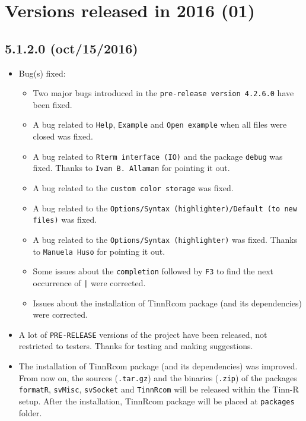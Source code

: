 
\hypertarget{2016}{}
\section{Versions released in 2016 (01)}

\subsection*{5.1.2.0 (oct/15/2016)}
\begin{itemize}
  \item Bug(s) fixed:
    \begin{itemize}
      \item Two major bugs introduced in the \texttt{pre-release version 4.2.6.0} have been fixed.
      \item A bug related to \texttt{Help}, \texttt{Example} and \texttt{Open example}
        when all files were closed was fixed.
      \item A bug related to \texttt{Rterm interface (IO)} and the package \texttt{debug} was fixed.
        Thanks to \texttt{Ivan B. Allaman} for pointing it out.
      \item A bug related to the \texttt{custom color storage} was fixed.
      \item A bug related to the \texttt{Options/Syntax (highlighter)/Default (to new files)} was fixed.
      \item A bug related to the \texttt{Options/Syntax (highlighter)} was fixed.
        Thanks to \texttt{Manuela Huso} for pointing it out.
      \item Some issues about the \texttt{completion} followed by \texttt{F3}
        to find the next occurrence of \texttt{|} were corrected.
      \item Issues about the installation of TinnRcom package (and its dependencies) were corrected.
    \end{itemize}
  \item A lot of \texttt{PRE-RELEASE} versions of the project have been released, not restricted to testers. Thanks for testing and making suggestions.
  \item The installation of TinnRcom package (and its dependencies) was improved. From now on, the sources (\texttt{.tar.gz}) and
    the binaries (\texttt{.zip}) of the packages \texttt{formatR}, \texttt{svMisc}, \texttt{svSocket} and \texttt{TinnRcom}
    will be released within the Tinn-R setup. After the installation, TinnRcom package will be placed at \texttt{packages} folder.

\end{itemize}
